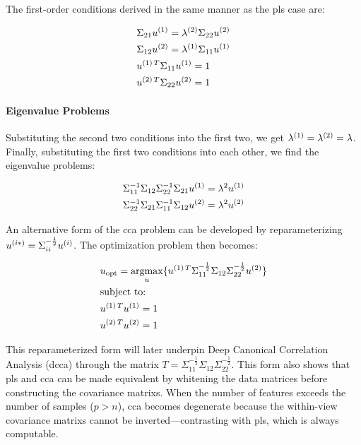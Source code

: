 The first-order conditions derived in the same manner as the \acrshort{pls} case are:

\begin{align}
    \label{CCA:FOCs}
    & \Sigma_{21}u^{(1)}=\lambda^{(2)} \Sigma_{22}u^{(2)} \\
    & \Sigma_{12}u^{(2)}=\lambda^{(1)} \Sigma_{11}u^{(1)} \\
    & u^{(1)\,T}\Sigma_{11}u^{(1)}=1                       \\
    & u^{(2)\,T}\Sigma_{22}u^{(2)}=1
\end{align}

\paragraph{Eigenvalue Problems}

Substituting the second two conditions into the first two, we get \(\lambda^{(1)}=\lambda^{(2)}=\lambda\). Finally, substituting the first two conditions into each other, we find the eigenvalue problems:

\begin{align}\label{eq:cca-eigenvalue-problems}
    & \Sigma_{11}^{-1}\Sigma_{12}\Sigma_{22}^{-1}\Sigma_{21}u^{(1)}=\lambda^2u^{(1)} \\
    & \Sigma_{22}^{-1}\Sigma_{21}\Sigma_{11}^{-1}\Sigma_{12}u^{(2)}=\lambda^2u^{(2)}
\end{align}

An alternative form of the \acrshort{cca} problem can be developed by reparameterizing \(u^{(i*)}=\Sigma_{ii}^{-\frac{1}{2}}u^{(i)}\). The optimization problem then becomes:

\begin{align}\label{eq:cca-reparameterized}
    & u_{\text{opt}}=\underset{u}{\mathrm{argmax}}\{ u^{(1)\,T}\Sigma_{11}^{-\frac{1}{2}}\Sigma_{12}\Sigma_{22}^{-\frac{1}{2}}u^{(2)} \} \\
    & \text{subject to:} \notag                                                                                                            \\
    & u^{(1)\,T}u^{(1)}=1 \notag                                                                                                         \\
    & u^{(2)\,T}u^{(2)}=1 \notag
\end{align}

This reparameterized form will later underpin Deep Canonical Correlation Analysis (\acrshort{dcca}) through the matrix $T=\Sigma_{11}^{-\frac{1}{2}}\Sigma_{12}\Sigma_{22}^{-\frac{1}{2}}$.
This form also shows that \acrshort{pls} and \acrshort{cca} can be made equivalent by whitening the data matrices before constructing the \glspl{covariance matrix}.
When the number of features exceeds the number of samples (\(p>n\)), \acrshort{cca} becomes degenerate because the within-view \glspl{covariance matrix} cannot be inverted—contrasting with \acrshort{pls}, which is always computable.

